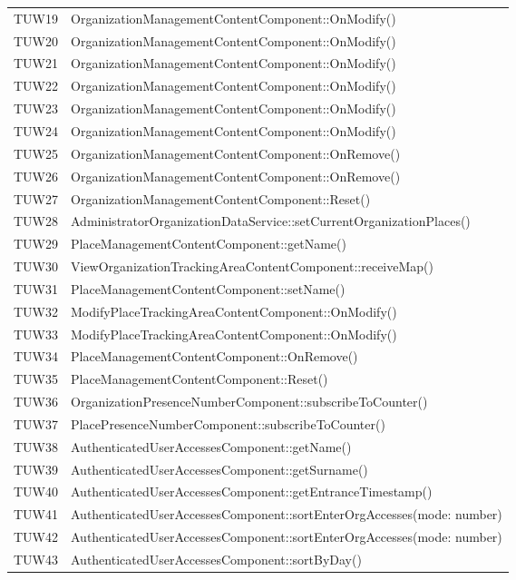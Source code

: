 {\begin{longtable}{C{2cm} C{12cm}}
		TUW19 & OrganizationManagementContentComponent::OnModify() \\
		TUW20 & OrganizationManagementContentComponent::OnModify() \\
		TUW21 & OrganizationManagementContentComponent::OnModify() \\
		TUW22 & OrganizationManagementContentComponent::OnModify() \\
		TUW23 & OrganizationManagementContentComponent::OnModify() \\
		TUW24 & OrganizationManagementContentComponent::OnModify() \\
		TUW25 & OrganizationManagementContentComponent::OnRemove() \\
		TUW26 & OrganizationManagementContentComponent::OnRemove() \\
		TUW27 & OrganizationManagementContentComponent::Reset() \\
		TUW28 & AdministratorOrganizationDataService::setCurrentOrganizationPlaces()\\
		TUW29 & PlaceManagementContentComponent::getName() \\
		TUW30 & ViewOrganizationTrackingAreaContentComponent::receiveMap() \\
		TUW31 & PlaceManagementContentComponent::setName() \\
		TUW32 & ModifyPlaceTrackingAreaContentComponent::OnModify() \\
		TUW33 & ModifyPlaceTrackingAreaContentComponent::OnModify() \\
		TUW34 & PlaceManagementContentComponent::OnRemove() \\
		TUW35 & PlaceManagementContentComponent::Reset() \\
		TUW36 & OrganizationPresenceNumberComponent::subscribeToCounter() \\
		TUW37 & PlacePresenceNumberComponent::subscribeToCounter() \\
		TUW38 & AuthenticatedUserAccessesComponent::getName() \\
		TUW39 & AuthenticatedUserAccessesComponent::getSurname() \\
		TUW40 & AuthenticatedUserAccessesComponent::getEntranceTimestamp() \\
		TUW41 & AuthenticatedUserAccessesComponent::sortEnterOrgAccesses(mode: number) \\
		TUW42 & AuthenticatedUserAccessesComponent::sortEnterOrgAccesses(mode: number) \\
		TUW43 & AuthenticatedUserAccessesComponent::sortByDay() \\

\end{longtable}}
